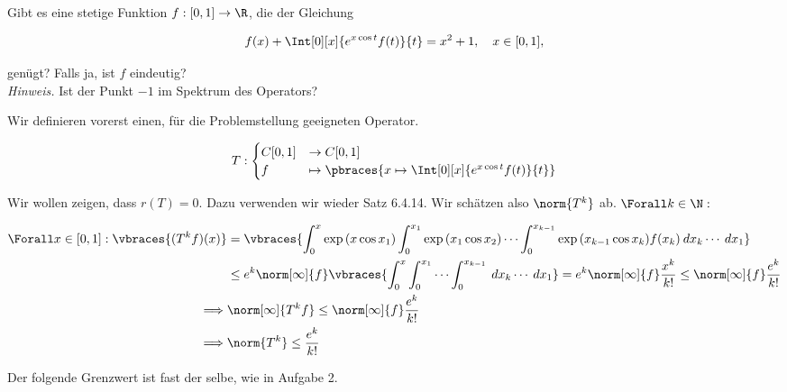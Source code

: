 \begin{exercise}[IO/5]

Gibt es eine stetige Funktion $f: [0, 1] \to \R$, die der Gleichung

\begin{align*}
  f(x) + \Int[0][x]{e^{x \cos{t}} f(t)}{t}
  =
  x^2 + 1,
  \quad
  x \in [0, 1],
\end{align*}

genügt?
Falls ja, ist $f$ eindeutig? \\

\textit{Hinweis.}
Ist der Punkt $-1$ im Spektrum des Operators?

\end{exercise}

\begin{solution}

Wir definieren vorerst einen, für die Problemstellung geeigneten Operator.

\begin{align*}
  T:
  \begin{cases}
    C[0, 1] & \to     C[0, 1] \\
    f       & \mapsto \pbraces
    {
      x
      \mapsto
      \Int[0][x]{e^{x \cos{t}} f(t)}{t}
    }
  \end{cases}
\end{align*}

Wir wollen zeigen, dass $r(T) = 0$.
Dazu verwenden wir wieder Satz 6.4.14.
Wir schätzen also $\norm{T^k}$ ab.
$\Forall k \in \N:$

\begin{align*}
  \Forall x \in [0, 1]:
  \vbraces{(T^k f)(x)}
  & =
  \vbraces
  {
    \int_0^x
    \exp{(x \cos{x_1})}
    \int_0^{x_1}
    \exp{(x_1 \cos{x_2})}
    \cdots
    \int_0^{x_{k-1}}
    \exp{(x_{k-1} \cos{x_k})}
    f(x_k)
    \: dx_k
    \cdots
    \: dx_1
  } \\
  & \leq
  e^k
  \norm[\infty]{f}
  \vbraces
  {
    \int_0^x
    \int_0^{x_1}
    \cdots
    \int_0^{x_{k-1}}
    \: dx_k
    \cdots
    \: dx_1
  }
  =
  e^k
  \norm[\infty]{f}
  \frac{x^k}{k!}
  \leq
  \norm[\infty]{f}
  \frac{e^k}{k!} \\
  \implies &
  \norm[\infty]{T^k f}
  \leq
  \norm[\infty]{f}
  \frac{e^k}{k!} \\
  \implies &
  \norm{T^k}
  \leq
  \frac{e^k}{k!}
\end{align*}

Der folgende Grenzwert ist fast der selbe, wie in Aufgabe 2.


\end{solution}

